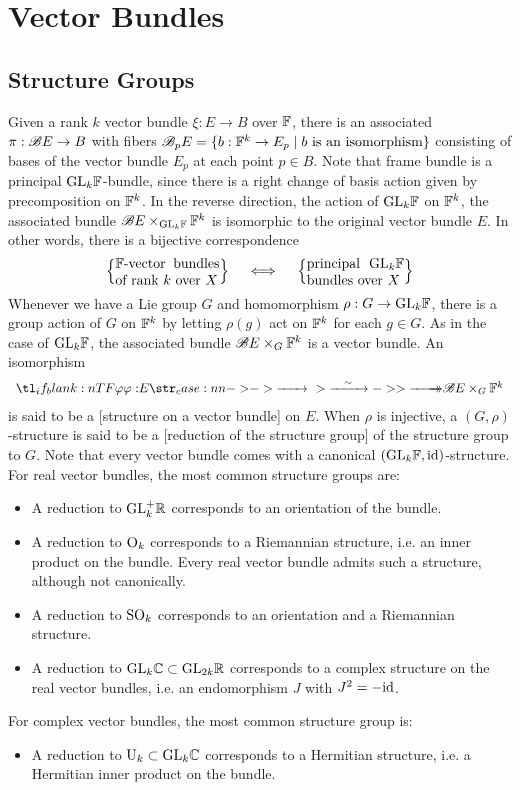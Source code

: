 \chapter{Vector Bundles}

\section{Structure Groups}

Given a rank $k$ vector bundle $\xi : E \to B$ over $\mathbb{F}$, there is an associated  $\pi : \mathscr{B} E \to B$ with fibers $\mathscr{B}_p E = \{ b : \mathbb{F}^k \to E_p \mid b\textrm{ is an isomorphism}\}$ consisting of bases of the vector bundle $E_p$ at each point $p\in B$. Note that frame bundle is a principal $\mathrm{GL}_k\mathbb{F}$-bundle, since there is a right change of basis action given by precomposition on $\mathbb{F}^k$.
In the reverse direction, the action of $\mathrm{GL}_k\mathbb{F}$ on $\mathbb{F}^k$, the associated bundle $\mathscr{B} E\times_{\mathrm{GL}_k\mathbb{F}} \mathbb{F}^k$ is isomorphic to the original vector bundle $E$. In other words, there is a bijective correspondence
\begin{equation}\label{eq:principal-GL-bundle-vector-bundle}
	\left\{\parbox{7.5em}{$\F$-vector bundles of rank $k$ over $X$}\right\}
	\quad\iff\quad
	\left\{\parbox{7em}{principal $\GL_k\F$ bundles over $X$}\right\}
\end{equation}
Whenever we have a Lie group $G$ and homomorphism $\rho : G \to \mathrm{GL}_k\mathbb{F}$, there is a group action of $G$ on $\mathbb{F}^k$ by letting $\rho(g)$ act on $\mathbb{F}^k$ for each $g\in G$. As in the case of $\mathrm{GL}_k \mathbb{F}$, the associated bundle $\mathscr{B} E\times_G \mathbb{F}^k$ is a vector bundle. An isomorphism
\begin{equation}\label{eq:structure-on-a-vector-bundle}
	\lkxfunc{\varphi}{E}{\B E\times_G \F^k}
\end{equation}
is said to be a [structure on a vector bundle] on $E$. When $\rho$ is injective, a $(G,\rho)$-structure is said to be a [reduction of the structure group] of the structure group to $G$.
Note that every vector bundle comes with a canonical $(\mathrm{GL}_k \mathbb{F}, \mathrm{id})$-structure.
For real vector bundles, the most common structure groups are:
\begin{itemize}
	\item A reduction to $\mathrm{GL}^+_k\mathbb{R}$ corresponds to an orientation of the bundle.
	\item A reduction to $\mathrm{O}_k$ corresponds to a Riemannian structure, i.e. an inner product on the bundle. Every real vector bundle admits such a structure, although not canonically.
	\item A reduction to $\mathrm{SO}_k$ corresponds to an orientation and a Riemannian structure.
	\item A reduction to $\mathrm{GL}_{k}\mathbb{C}\subset \mathrm{GL}_{2k}\mathbb{R}$ corresponds to a complex structure on the real vector bundles, i.e. an endomorphism $J$ with $J^2=-\mathrm{id}$.
\end{itemize}
For complex vector bundles, the most common structure group is:
\begin{itemize}
	\item A reduction to $\mathrm{U}_k\subset \mathrm{GL}_k\mathbb{C}$ corresponds to a Hermitian structure, i.e. a Hermitian inner product on the bundle.
\end{itemize}

